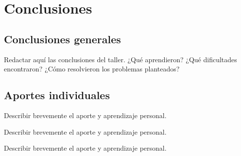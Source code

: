 
\section{Conclusiones}

\subsection{Conclusiones generales}

Redactar aquí las conclusiones del taller. ¿Qué aprendieron? ¿Qué dificultades encontraron?
¿Cómo resolvieron los problemas planteados?

\subsection{Aportes individuales}

\begin{description}[leftmargin=2cm, style=nextline]
    \item[Integrante 1:] Describir brevemente el aporte y aprendizaje personal.
    \item[Integrante 2:] Describir brevemente el aporte y aprendizaje personal.
    \item[Integrante 3:] Describir brevemente el aporte y aprendizaje personal.
\end{description}

